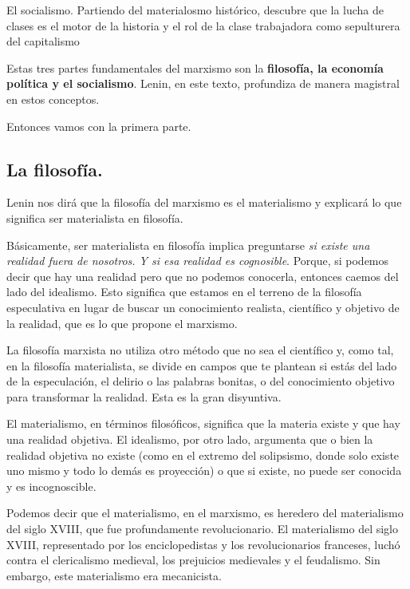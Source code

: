 \documentclass[
  a4paper,
]{article}
\begin{document}
El socialismo. Partiendo del materialosmo histórico, descubre que la
lucha de clases es el motor de la historia y el rol de la clase
trabajadora como sepulturera del capitalismo

Estas tres partes fundamentales del marxismo son la \textbf{filosofía,
la economía política y el socialismo}. Lenin, en este texto, profundiza
de manera magistral en estos conceptos.

Entonces vamos con la primera parte.

\hypertarget{la-filosofuxeda.}{%
\subsection{La filosofía.}\label{la-filosofuxeda.}}

Lenin nos dirá que la filosofía del marxismo es el materialismo y
explicará lo que significa ser materialista en filosofía.

Básicamente, ser materialista en filosofía implica preguntarse \emph{si
existe una realidad fuera de nosotros. Y si esa realidad es cognosible}.
Porque, si podemos decir que hay una realidad pero que no podemos
conocerla, entonces caemos del lado del idealismo. Esto significa que
estamos en el terreno de la filosofía especulativa en lugar de buscar un
conocimiento realista, científico y objetivo de la realidad, que es lo
que propone el marxismo.

La filosofía marxista no utiliza otro método que no sea el científico y,
como tal, en la filosofía materialista, se divide en campos que te
plantean si estás del lado de la especulación, el delirio o las palabras
bonitas, o del conocimiento objetivo para transformar la realidad. Esta
es la gran disyuntiva.

El materialismo, en términos filosóficos, significa que la materia
existe y que hay una realidad objetiva. El idealismo, por otro lado,
argumenta que o bien la realidad objetiva no existe (como en el extremo
del solipsismo, donde solo existe uno mismo y todo lo demás es
proyección) o que si existe, no puede ser conocida y es incognoscible.

Podemos decir que el materialismo, en el marxismo, es heredero del
materialismo del siglo XVIII, que fue profundamente revolucionario. El
materialismo del siglo XVIII, representado por los enciclopedistas y los
revolucionarios franceses, luchó contra el clericalismo medieval, los
prejuicios medievales y el feudalismo. Sin embargo, este materialismo
era mecanicista.
\end{document}
